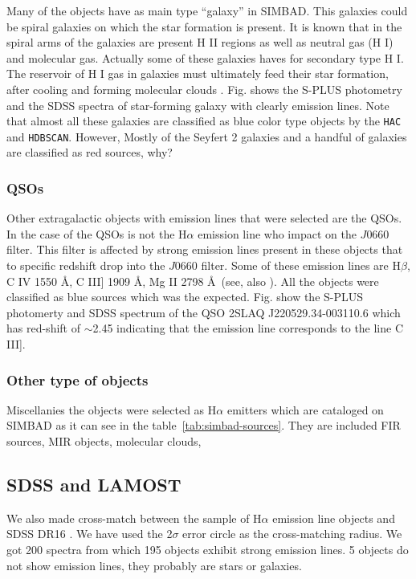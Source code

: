\documentclass[fleqn,usenatbib]{mnras}
\begin{document}
Many of the objects have as main type ``galaxy'' in SIMBAD. This galaxies
could be spiral galaxies on which the star formation is present. It is known
that in the spiral arms of the galaxies are present H II regions as well as
neutral gas (H I) and molecular gas. Actually some of these galaxies haves for
secondary type H I. The reservoir of H I gas in galaxies must ultimately
feed their star formation, after cooling and forming molecular
clouds \citep{van-Driel:2016}. Fig. shows the S-PLUS photometry and
the SDSS spectra of star-forming galaxy with clearly emission lines.
Note that almost all these galaxies are classified as blue color 
type objects by the \texttt{HAC} and \texttt{HDBSCAN}.
However, Mostly of the Seyfert 2 galaxies and a handful of galaxies are classified as
red sources, why?

\subsubsection{QSOs}
Other extragalactic objects with emission lines that were selected are the
QSOs. In the case of the QSOs is not the H{$\alpha$} emission line who impact
on the $J$0660 filter. This filter is affected by strong emission lines present in
these objects that to specific redshift drop into the $J$0660 filter.
Some of these emission lines are H{$\beta$}, C {\sc IV} 1550 \AA, C {\sc III]} 1909 \AA,
  Mg {\sc II} 2798 \AA~(see, also \citealp{Gutierrez:2020, Nakazono:2021}).
  All the objects were classified as blue sources which was the expected.
  Fig. show the S-PLUS photomerty and SDSS spectrum of the QSO 2SLAQ J220529.34-003110.6
  which has red-shift of $\sim$2.45 indicating that the emission line corresponds to
  the line C {\sc III]}.
  

  \subsubsection{Other type of objects}
  
  Miscellanies the objects were selected as H{$\alpha$} emitters which are cataloged on 
  SIMBAD as it can see in the table~\ref{tab:simbad-sources}. They are included FIR 
  sources, MIR objects, molecular clouds, 

\subsection{SDSS and LAMOST}

We also made cross-match between the sample of H{$\alpha$} emission line objects and SDSS DR16
\citep{Ahumada:2020}. We have used the 2$\sigma$ error circle as the cross-matching radius.
We got 200 spectra from which 195 objects exhibit strong emission lines. 5 objects do not show
emission lines, they probably are stars or galaxies.
\end{document}
